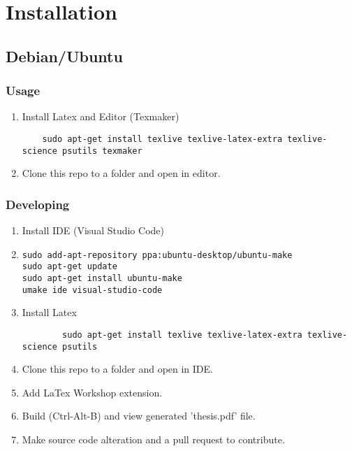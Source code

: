 \chapter{Installation}

\section*{Debian/Ubuntu}

\subsection*{Usage}
\begin{enumerate}
\item Install Latex and Editor (Texmaker) \\
\begin{verbatim} 
	sudo apt-get install texlive texlive-latex-extra texlive-science psutils texmaker
\end{verbatim}
\item Clone this repo to a folder and open in editor.
\end{enumerate}
\subsection*{Developing}
\begin{enumerate}
\item Install IDE (Visual Studio Code) \\
\item \begin{verbatim} 
sudo add-apt-repository ppa:ubuntu-desktop/ubuntu-make
sudo apt-get update
sudo apt-get install ubuntu-make
umake ide visual-studio-code
\end{verbatim}
\item Install Latex\\
\begin{verbatim} 
		sudo apt-get install texlive texlive-latex-extra texlive-science psutils
\end{verbatim}
\item Clone this repo to a folder and open in IDE.
\item Add LaTex Workshop extension.
\item Build (Ctrl-Alt-B) and view generated 'thesis.pdf' file.
\item Make source code alteration and a pull request to contribute.
\end{enumerate}




